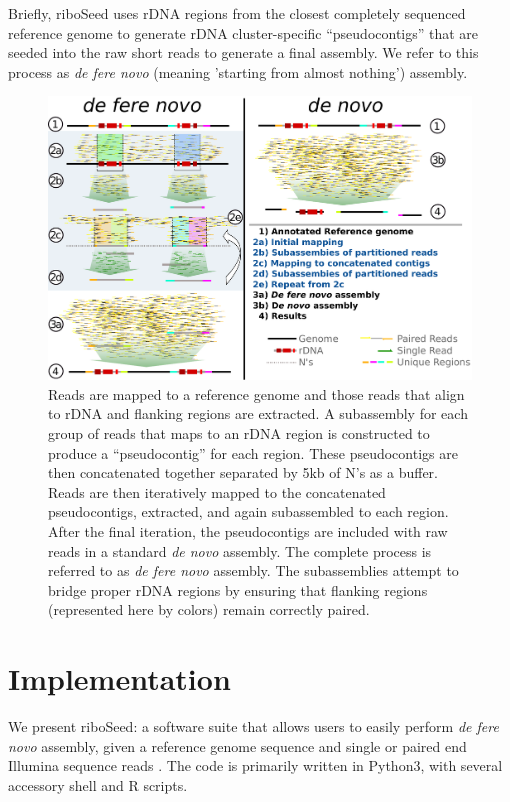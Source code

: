 \documentclass[11pt]{article}
\begin{document}
\begin{linenumbers}
Briefly, riboSeed uses rDNA regions from the closest completely sequenced reference genome to generate rDNA cluster-specific “pseudocontigs” that are seeded into the raw short reads to generate a final assembly. We refer to this process as \textit{de fere novo} (meaning 'starting from almost nothing') assembly.


\begin{figure}[h]
  \centering
  \includegraphics[width=1\textwidth]{riboSeed_v11}
  \caption{Reads are mapped to a reference genome and those reads that align to rDNA and flanking regions are extracted. A subassembly for each group of reads that maps to an rDNA region is constructed to produce a “pseudocontig” for each region. These pseudocontigs are then concatenated together separated by 5kb of N’s as a buffer. Reads are then iteratively mapped to the concatenated pseudocontigs, extracted, and again subassembled to each region. After the final iteration, the pseudocontigs are included with raw reads in a standard \textit{de novo} assembly. The complete process is referred to as \textit{de fere novo} assembly. The subassemblies attempt to bridge proper rDNA regions by ensuring that flanking regions (represented here by colors) remain correctly paired.
  }
  \label{fig:overview}
\end{figure}




\section*{Implementation}
We present riboSeed: a software suite that allows users to easily perform \textit{de fere novo} assembly, given a reference genome sequence and single or paired end Illumina sequence reads . The code is primarily written in Python3, with several accessory shell and R scripts.



\end{linenumbers}
\end{document}
